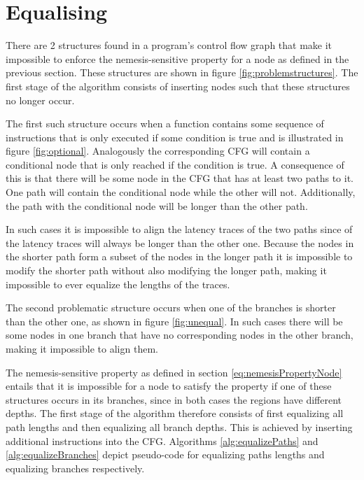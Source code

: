 \begin{figure}
 \centering

 \label{fig:regionExamples}
\end{figure}


\section{Equalising}\label{seq:equalising}
There are 2 structures found in a program's control flow graph that make it impossible to enforce the nemesis-sensitive property for a node as defined in the previous section. 
These structures are shown in figure \ref{fig:problemstructures}.  
The first stage of the algorithm consists of inserting nodes such that these structures no longer occur. 

The first such structure occurs when a function contains some sequence of instructions that is only executed if some condition is true and is illustrated in figure \ref{fig:optional}.
Analogously the corresponding CFG will contain a conditional node that is only reached if the condition is true.
A consequence of this is that there will be some node in the CFG that has at least two paths to it. One path will contain the conditional node while the other will not. 
Additionally, the path with the conditional node will be longer than the other path. 


In such cases it is impossible to align the latency traces of the two paths since of the latency traces will always be longer than the other one. 
Because the nodes in the shorter path form a subset of the nodes in the longer path it is impossible to modify the shorter path without also modifying the longer path, making it 
impossible to ever equalize the lengths of the traces. 

The second problematic structure occurs when one of the branches is shorter than the other one, as shown in figure \ref	{fig:unequal}. In such cases there will be some nodes in 
one branch that have no corresponding nodes in the other branch, making it impossible to align them. 

The nemesis-sensitive property as defined in section \ref{eq:nemesisPropertyNode} entails that it is impossible for a node to satisfy the property if one of these 
structures occurs in its branches, since in both cases the regions have different depths. 
The first stage of the algorithm therefore consists of first equalizing all path lengths and then 
equalizing all branch depths. This is achieved by inserting additional instructions into the CFG.  
Algorithms \ref{alg:equalizePaths} and \ref{alg:equalizeBranches} depict pseudo-code for equalizing paths lengths and equalizing branches respectively. 

